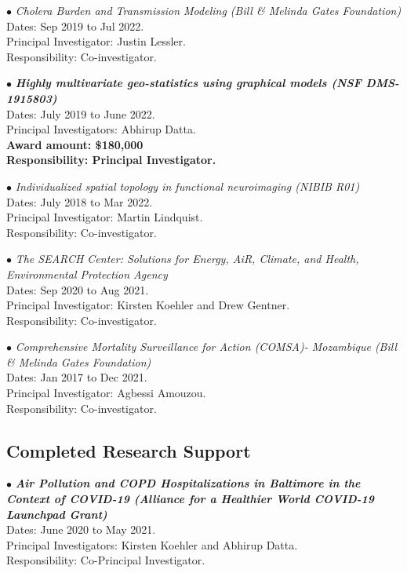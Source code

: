 \documentclass[12pt]{article}
\newcommand{\dn}[1]{{\color{black} {#1}}}
\begin{document}
\item[$\bullet$]
{\it Cholera Burden and Transmission Modeling (Bill \& Melinda Gates Foundation)}\\[0.0em]
\dn{Dates:} Sep 2019 to Jul 2022.\\
\dn{Principal Investigator:} Justin Lessler.\\
\dn{Responsibility:} Co-investigator.

\item[$\bullet$]
{\it \textbf{Highly multivariate geo-statistics using graphical models (NSF DMS-1915803)}}\\[0.0em]
\dn{Dates:} July 2019 to June 2022.\\
\dn{Principal Investigators:} Abhirup Datta.\\
\textbf{\dn{Award amount:} \$180,000}\\
\textbf{\dn{Responsibility:} Principal Investigator.}

\item[$\bullet$]
{\it Individualized spatial topology in functional neuroimaging (NIBIB R01)}\\[0.0em]
\dn{Dates:} July 2018 to Mar 2022.\\
\dn{Principal Investigator:} Martin Lindquist.\\
\dn{Responsibility:} Co-investigator.

\item[$\bullet$]
{\it The SEARCH Center: Solutions for Energy, AiR, Climate, and Health, Environmental Protection Agency}\\[0.0em]
\dn{Dates:} Sep 2020 to Aug 2021.\\
\dn{Principal Investigator:} Kirsten Koehler and Drew Gentner.\\
\dn{Responsibility:} Co-investigator.

\item[$\bullet$]
{\it Comprehensive Mortality Surveillance for Action (COMSA)- Mozambique (Bill \& Melinda Gates Foundation)}\\[0.0em]
\dn{Dates:} Jan 2017 to Dec 2021.\\
\dn{Principal Investigator:} Agbessi Amouzou.\\
\dn{Responsibility:} Co-investigator.

\subsection*{Completed Research Support}

\item[$\bullet$]
{\it \textbf{Air Pollution and COPD Hospitalizations in Baltimore in the Context of COVID-19 (Alliance for a Healthier World COVID-19 Launchpad Grant)}}\\[0.0em]
\dn{Dates:} June 2020 to May 2021.\\
\dn{Principal Investigators:} Kirsten Koehler and Abhirup Datta.\\
\dn{Responsibility:} Co-Principal Investigator.
\end{document}
